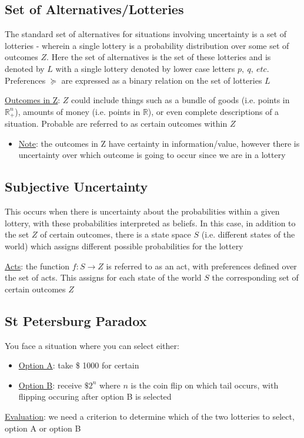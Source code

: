 \documentclass{article}
\begin{document}
\subsection{Set of Alternatives/Lotteries}
The standard set of alternatives for situations involving uncertainty is a set of lotteries - wherein a single lottery is a probability distribution over some set of outcomes $Z$. Here the set of alternatives is the set of these lotteries and is denoted by $L$ with a single lottery denoted by lower case letters $p, \ q, \ etc$. Preferences $\succeq$ are expressed as a binary relation on the set of lotteries $L$ \par \vspace{0.3em}
  \underline{Outcomes in Z}: $Z$ could include things such as a bundle of goods (i.e. points in $\mathbb{R}_{+}^{n}$), amounts of money (i.e. points in $\mathbb{R}$), or even complete descriptions of a situation. Probable are referred to as certain outcomes within $Z$
  \begin{itemize}
    \item \underline{Note}: the outcomes in Z have certainty in information/value, however there is uncertainty over which outcome is going to occur since we are in a lottery
  \end{itemize}
  \par
\vspace{6mm}
\subsection{Subjective Uncertainty}
This occurs when there is uncertainty about the probabilities within a given lottery, with these probabilities interpreted as beliefs. In this case, in addition to the set $Z$ of certain outcomes, there is a state space $S$ (i.e. different states of the world) which assigns different possible probabilities for the lottery \par \vspace{0.3em}
  \underline{Acts}: the function $f: S \rightarrow Z$ is referred to as an act, with preferences defined over the set of acts. This assigns for each state of the world $S$ the corresponding set of certain outcomes $Z$
  \par
\vspace{6mm}
\subsection{St Petersburg Paradox}
You face a situation where you can select either:
\begin{itemize}
  \item  \underline{Option A}: take \$ 1000 for certain
  \item  \underline{Option B}: receive $\$ 2^{n}$ where $n$ is the coin flip on which tail occurs, with flipping occuring after option B is selected
\end{itemize}
\par \vspace{0.3em}
  \underline{Evaluation}: we need a criterion to determine which of the two lotteries to select, option A or option B
  \par
\vspace{6mm}
\end{document}
